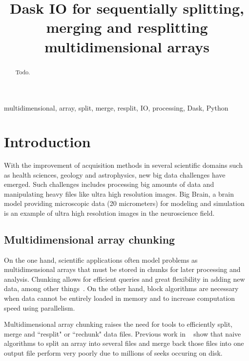 \documentclass[conference]{IEEEtran}
\begin{document}
\title{ Dask IO for sequentially splitting, merging and resplitting multidimensional arrays }

\author{
}

\maketitle

\begin{abstract}
Todo.
\end{abstract}

\begin{IEEEkeywords}
multidimensional, array, split, merge, resplit, IO, processing, Dask, Python
\end{IEEEkeywords}

\section{Introduction}
With the improvement of acquisition methods in several scientific domains such as
health sciences, geology and astrophysics, new big data challenges have emerged.
Such challenges includes processing big amounts of data and manipulating heavy
files like ultra high resolution images. Big Brain, a brain model providing
microscopic data (20 micrometers) for modeling and simulation~\cite{Amunts1472}
is an example of ultra high resolution images in the neuroscience field.

\subsection{Multidimensional array chunking}
On the one hand, scientific applications often model problems as multidimensional
arrays that must be stored in chunks for later processing and analysis. Chunking
allows for efficient queries and great flexibility in adding new data, among
other things~\cite{optimal_chuking}. On the other hand, block algorithms are
necessary when data cannot be entirely loaded in memory and to increase
computation speed using parallelism.

Multidimensional array chunking raises the need for tools to efficiently split,
merge and ``resplit" or ``rechunk" data files. Previous work in ~\cite{seqalgorithms}
show that naive algorithms to split an array into several files and merge back
those files into one output file perform very poorly due to millions of seeks
occuring on disk.
\end{document}
